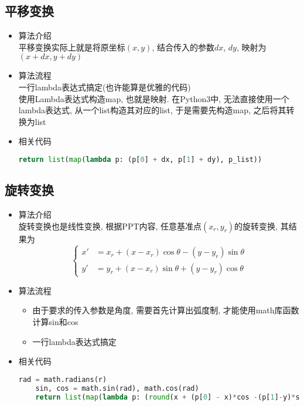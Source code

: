 \documentclass[a4paper,UTF8]{article}
\theoremstyle{definition}
\begin{document}
\subsection{平移变换}
\begin{itemize}
  \item 算法介绍\\
  平移变换实际上就是将原坐标$(x,y)$, 结合传入的参数$dx$, $dy$, 映射为$(x+dx, y+dy)$
  \item 算法流程\\
  一行lambda表达式搞定(也许能算是优雅的代码)\\
  使用Lambda表达式构造map, 也就是映射. 在Python3中, 无法直接使用一个lambda表达式, 从一个list构造其对应的list, 于是需要先构造map, 之后将其转换为list
  \item 相关代码
  \begin{lstlisting}[language={Python}] 
    return list(map(lambda p: (p[0] + dx, p[1] + dy), p_list))\end{lstlisting}
\end{itemize}
\subsection{旋转变换}
\begin{itemize}
  \item 算法介绍\\
  旋转变换也是线性变换, 根据PPT内容, 任意基准点$(x_r, y_r)$的旋转变换, 其结果为
  $$\begin{cases}
    x' &= x_r + (x-x_r)\cos\theta - (y-y_r)\sin\theta\\
    y' &= y_r + (x-x_r)\sin\theta + (y-y_r)\cos\theta
  \end{cases}$$
  \item 算法流程\begin{itemize}
    \item 由于要求的传入参数是角度, 需要首先计算出弧度制, 才能使用math库函数计算sin和cos
    \item 一行lambda表达式搞定
  \end{itemize}
  \item 相关代码
  \begin{lstlisting}[language={Python}]     
    rad = math.radians(r)
    sin, cos = math.sin(rad), math.cos(rad)
    return list(map(lambda p: (round(x + (p[0] - x)*cos -(p[1]-y)*sin), round(y + (p[0] - x)*sin +(p[1]-y)*cos)), p_list))\end{lstlisting}
\end{itemize}
\end{document}
